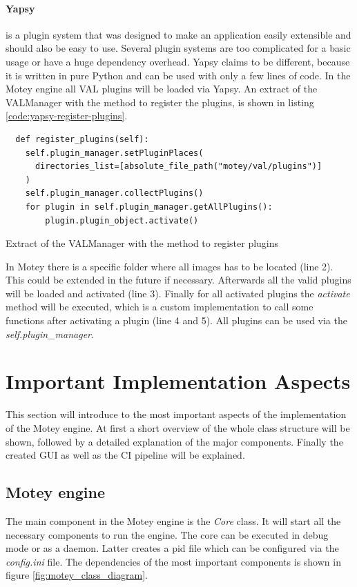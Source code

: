 \paragraph{Yapsy} is a plugin system that was designed to make an application easily extensible and should also be easy to use.
Several plugin systems are too complicated for a basic usage or have a huge dependency overhead.
Yapsy claims to be different, because it is written in pure Python and can be used with only a few lines of code.
In the Motey engine all \ac{VAL} plugins will be loaded via Yapsy.
An extract of the VALManager with the method to register the plugins, is shown in listing \ref{code:yapsy-register-plugins}.
\begin{listing}[H]
  \begin{verbatim}
  def register_plugins(self):
    self.plugin_manager.setPluginPlaces(
      directories_list=[absolute_file_path("motey/val/plugins")]
    )
    self.plugin_manager.collectPlugins()
    for plugin in self.plugin_manager.getAllPlugins():
        plugin.plugin_object.activate()
  \end{verbatim}
  \caption{Extract of the VALManager with the method to register plugins}
  \label{code:yapsy-register-plugins}
\end{listing}
In Motey there is a specific folder where all images has to be located (line 2).
This could be extended in the future if necessary.
Afterwards all the valid plugins will be loaded and activated (line 3).
Finally for all activated plugins the \textit{activate} method will be executed, which is a custom implementation to call some functions after activating a plugin (line 4 and 5).
All plugins can be used via the \textit{self.plugin\_manager}.

\section{Important Implementation Aspects}
This section will introduce to the most important aspects of the implementation of the Motey engine.
At first a short overview of the whole class structure will be shown, followed by a detailed explanation of the major components.
Finally the created \ac{GUI} as well as the \ac{CI} pipeline will be explained.


\subsection{Motey engine}
The main component in the Motey engine is the \textit{Core} class.
It will start all the necessary components to run the engine.
The core can be executed in debug mode or as a daemon.
Latter creates a pid file which can be configured via the \textit{config.ini} file.
The dependencies of the most important components is shown in figure \ref{fig:motey_class_diagram}.

